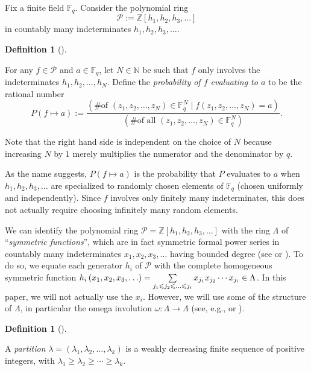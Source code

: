 \documentclass[numbers=enddot,12pt,final,onecolumn,notitlepage]{scrartcl}%
\theoremstyle{definition}
\newtheorem{defi}[theo]{Definition}
\newenvironment{definition}[1][]
{\begin{defi}[#1]\begin{leftbar}}
{\end{leftbar}\end{defi}}
\let\sumnonlimits\sum
\renewcommand{\sum}{\sumnonlimits\limits}
\newcommand{\tup}[1]{\left( #1 \right)}
\newcommand{\Fq}{\mathbb{F}_q}
\renewcommand{\leq}{\leqslant}
\renewcommand{\geq}{\geqslant}
\theoremstyle{plainsl}
\begin{document}
Fix a finite field $\Fq$. Consider the polynomial ring
\[
\mathcal{P} := \mathbb{Z}\left[  h_{1},h_{2},h_{3},\ldots\right]
\]
in countably many indeterminates $h_{1},h_{2},h_{3},\ldots$.

\begin{definition}
\label{def.mapstozero}
For any $f\in\mathcal{P}$ and $a\in \Fq$,
let $N\in\mathbb{N}$ be such that $f$ only
involves the indeterminates $h_{1},h_{2},\ldots,h_{N}$.
Define the \emph{probability of $f$ evaluating to $a$}
to be the rational number
\[
P\left(  f\mapsto a\right)  :=\dfrac{\left(  \text{\# of }\left(  z_{1}%
,z_{2},\ldots,z_{N}\right)  \in \Fq^{N} \mid f\left(
z_{1},z_{2},\ldots,z_{N}\right)  =a\right)  }{\left(  \text{\# of all }\left(
z_{1},z_{2},\ldots,z_{N}\right)  \in \Fq^{N}\right)  }.
\]
\end{definition}

Note that the right hand side is independent on the choice of $N$
because increasing $N$ by $1$
merely multiplies the numerator and the denominator by $q$.

As the name suggests, $P\tup{f \mapsto a}$ is the probability that
$P$ evaluates to $a$ when $h_1, h_2, h_3, \ldots$ are specialized
to randomly chosen elements of $\Fq$ (chosen uniformly and
independently). Since $f$ involves only finitely many indeterminates,
this does not actually require choosing infinitely many random
elements.

We can identify the polynomial ring
$\mathcal{P}=\mathbb{Z}\left[  h_{1},h_{2},h_{3},\ldots\right]  $
with the ring $\Lambda$ of ``\emph{symmetric
functions}'', which are in fact symmetric formal power series in
countably many indeterminates $x_{1},x_{2},x_{3},\ldots$
having bounded degree (see \cite[Section 7.1]{EC2} or
\cite[Section I.2]{Macdonald}).
To do so, we equate each generator $h_i$ of $\mathcal{P}$
with the complete homogeneous symmetric function
$h_i\tup{x_1, x_2, x_3, \ldots}
= \sum\limits_{j_1 \leq j_2 \leq \ldots \leq j_i}
x_{j_1} x_{j_2} \cdots x_{j_i} \in \Lambda$.
In this paper, we will not actually use the $x_i$.
However, we will use some of the structure of $\Lambda$, in
particular the omega involution $\omega : \Lambda \to \Lambda$
(see, e.g., \cite[Section 7.6]{EC2} or \cite[(I.2.7)]{Macdonald}).

\begin{definition}
A \emph{partition} $\lambda = \left(\lambda_1, \lambda_2, \ldots, \lambda_k\right)$ is a
weakly decreasing finite sequence of positive integers, with
$\lambda_1 \geq \lambda_2 \geq \cdots \geq \lambda_k$.
\end{definition}
\end{document}
